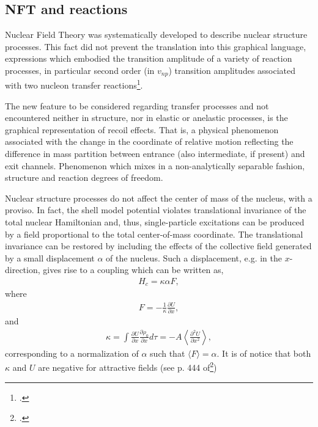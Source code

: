 \begin{subappendices}
\section{NFT and reactions}\label{App1.D}
Nuclear Field Theory was systematically developed to describe nuclear structure processes. This fact did not prevent the translation into this graphical language,  expressions which embodied the transition amplitude of a variety of reaction processes, in particular second order (in $v_{np}$) transition amplitudes associated with two nucleon transfer reactions\footnote{\cite{Broglia:75,Broglia:04a}.}.




The new feature to be considered regarding transfer processes and not encountered neither in structure, nor in elastic or anelastic processes, is the graphical representation of recoil effects. That is, a physical phenomenon associated with the change in the coordinate of relative motion reflecting the difference in mass partition between entrance (also intermediate, if present) and exit channels. Phenomenon which mixes in a non-analytically separable fashion, structure and reaction degrees of freedom.

Nuclear structure processes do not affect the center of mass of the nucleus, with a proviso. In fact, the shell model potential violates translational invariance of the total nuclear Hamiltonian and, thus, single-particle excitations can be produced by a field proportional to the total center-of-mass coordinate. The translational invariance can be restored by including  the effects of the collective field generated by a small displacement $\alpha$ of the nucleus. Such a displacement, e.g. in the $x$-direction, gives rise to a coupling which can be written as,
\begin{align}\label{eq1.D.1}
H_{c}=\kappa\alpha F,
\end{align}
where 
\begin{align}\label{eq1.D.2}
F=-\frac{1}{\kappa}\frac{\partial U}{\partial x},
\end{align}
and
\begin{align}\label{eq1.D.3}
\kappa=\int\frac{\partial U}{\partial x}\frac{\partial \rho_0}{\partial x}d\tau=-A\left\langle\frac{\partial^2U}{\partial x^2}\right\rangle,
\end{align}
corresponding to a normalization of $\alpha$ such that $\langle F\rangle=\alpha$. It is of notice that both $\kappa$ and $U$ are negative for attractive fields (see p. 444 of\footnote{\cite{Bohr:75}.})



\end{subappendices}
